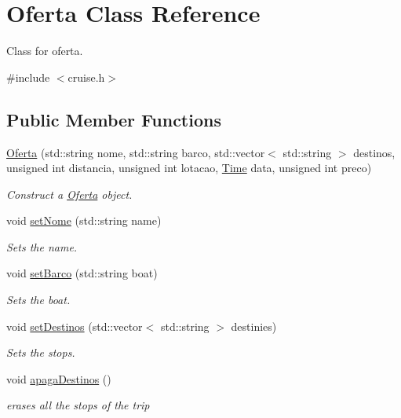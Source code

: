 \hypertarget{classOferta}{}\section{Oferta Class Reference}
\label{classOferta}


Class for oferta.  




{\ttfamily \#include $<$cruise.\+h$>$}

\subsection*{Public Member Functions}
\begin{DoxyCompactItemize}
\item 
\hyperlink{classOferta_a49a53f9d6ba51f97a3b428c8fac98d7f}{Oferta} (std\+::string nome, std\+::string barco, std\+::vector$<$ std\+::string $>$ destinos, unsigned int distancia, unsigned int lotacao, \hyperlink{classTime}{Time} data, unsigned int preco)
\begin{DoxyCompactList}\small\item\em Construct a \hyperlink{classOferta}{Oferta} object. \end{DoxyCompactList}\item 
void \hyperlink{classOferta_a65327899463413d06e8d57291ac797cd}{set\+Nome} (std\+::string name)
\begin{DoxyCompactList}\small\item\em Sets the name. \end{DoxyCompactList}\item 
void \hyperlink{classOferta_a618e63a54f6c5cb2988efb2db5625847}{set\+Barco} (std\+::string boat)
\begin{DoxyCompactList}\small\item\em Sets the boat. \end{DoxyCompactList}\item 
void \hyperlink{classOferta_ae73dec907ff619093f06492f5f30ebe0}{set\+Destinos} (std\+::vector$<$ std\+::string $>$ destinies)
\begin{DoxyCompactList}\small\item\em Sets the stops. \end{DoxyCompactList}\item 
void \hyperlink{classOferta_a1c2caf1032ad1a24706db8fb3bcfa980}{apaga\+Destinos} ()
\begin{DoxyCompactList}\small\item\em erases all the stops of the trip \end{DoxyCompactList}\item 

\end{DoxyCompactItemize}
